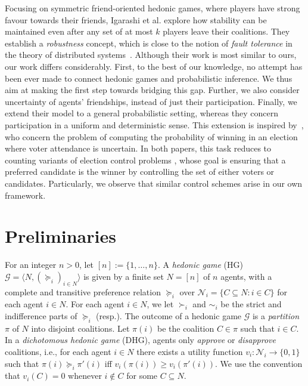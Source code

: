 \documentclass[letterpaper]{article} %
\begin{document}
Focusing on symmetric friend-oriented hedonic games, where players have strong favour towards their friends, Igarashi et al.  explore how stability can be maintained even after any set of at most $k$ players leave their coalitions. They establish a \textit{robustness} concept, which is close to the notion of \textit{fault tolerance} in the theory of distributed systems~\cite{fedoruk2002improving}. Although their work is most similar to ours, our work differs considerably. First, to the best of our knowledge, no attempt has been ever made to connect hedonic games and probabilistic inference. We thus aim at making the first step towards bridging this gap. Further, we also consider uncertainty of agents’ friendships, instead of just their participation. Finally, we extend their model to a general probabilistic setting, whereas they concern participation in a uniform and deterministic sense. This extension is inspired by~\cite{imber2021probabilistic,wojtas2012possible}, who concern the problem of computing the probability of winning in an election where voter attendance is uncertain. In both papers, this task reduces to counting variants of election control problems \cite{bartholdi1992hard}, whose goal is ensuring that a preferred candidate is the winner by controlling the set of either voters or candidates. Particularly, we observe that similar control schemes arise in our own framework.

\section{Preliminaries}
\label{sec:Preliminaries}
For an integer $n > 0$, let $[n] := \{1,\dots,n\}$.
A \textit{hedonic game} (HG) $\mathcal{G} = \langle N, (\succeq_i)_{i \in N} \rangle$ is given by a finite set $N = [n]$ of $n$ agents, with a complete and transitive preference relation $\succeq_i$ over $\mathcal{N}_i = \{C \subseteq N : i \in C\}$ for each agent $i \in N$. For each agent $i \in N$, we let $\succ_i$ and $\sim_i$ be the strict and indifference parts of $\succeq_i$ (resp.). The outcome of a hedonic game $\mathcal{G}$ is a \textit{partition} $\pi$ of $N$ into disjoint coalitions. Let $\pi(i)$ be the coalition $C \in \pi$ such that $i \in C$. In a \textit{dichotomous hedonic game} (DHG), agents only \textit{approve} or \textit{disapprove} coalitions, i.e., for each agent $i \in N$ there exists a utility function $v_i: \mathcal{N}_i \rightarrow \{0,1\}$ such that $\pi(i) \succeq_i \pi'(i)$ iff $v_i(\pi(i)) \geq v_i(\pi'(i))$. We use the convention that $v_i(C) = 0$ whenever $i \notin C$ for some $C \subseteq N$.
%
\end{document}
